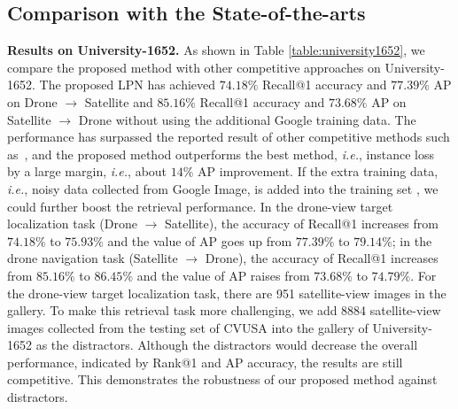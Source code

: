 \documentclass[journal]{IEEEtran}
\def\ie{\emph{i.e.}}
\begin{document}
\subsection{Comparison with the State-of-the-arts}\label{sota}
\textbf{Results on University-1652.} 
As shown in Table \ref{table:university1652}, we compare the proposed method with other competitive approaches on University-1652. The proposed LPN has achieved $74.18\%$ Recall@1 accuracy and $77.39\%$ AP on Drone $\rightarrow$ Satellite and $85.16\%$ Recall@1 accuracy and $73.68\%$ AP on Satellite $\rightarrow$ Drone without using the additional Google training data. 
The performance has surpassed the reported result of other competitive methods such as~\cite{lin_learning_2015,workman_wide-area_2015,chechik2009large,deng2018triplet,hu_cvm-net_2018,liu_lending_2019}, and the proposed method outperforms the best method, \ie, instance loss~\cite{zheng_university-1652_nodate} by a large margin, \ie, about $14\%$ AP improvement.
If the extra training data, \ie, noisy data collected from Google Image, is added into the training set \cite{zheng_university-1652_nodate}, we could further boost the retrieval performance. In the drone-view target localization task (Drone $\rightarrow$ Satellite), the accuracy of Recall@1 increases from $74.18\%$ to $75.93\%$ and the value of AP goes up from $77.39\%$ to $79.14\%$; in the drone navigation task (Satellite $\rightarrow$ Drone), the accuracy of Recall@1 increases from $85.16\%$ to $86.45\%$ and the value of AP raises from $73.68\%$ to $74.79\%$. For the drone-view target localization task, there are 951 satellite-view images in the gallery. To make this retrieval task more challenging, we add 8884 satellite-view images collected from the testing set of CVUSA into the gallery of University-1652 as the distractors. Although the distractors would decrease the overall performance, indicated by Rank@1 and AP accuracy, the results are still competitive. This demonstrates the robustness of our proposed method against distractors.
\end{document}
